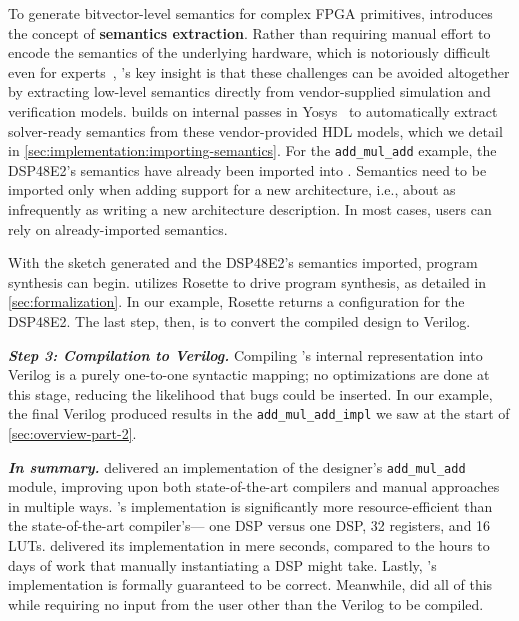 To generate bitvector-level semantics
  for complex FPGA primitives,
  \lr introduces the concept of
  \textbf{semantics extraction}.
Rather than requiring
  manual effort to encode the semantics
  of the underlying hardware,
  which is notoriously difficult
  even for experts~\cite{Bernstein2021WhatAT},
  \lr's key insight is that these challenges
  can be avoided altogether
  by extracting low-level semantics
  directly from
  vendor-supplied simulation and verification models.
\lr builds on internal passes in 
  Yosys~\cite{wolf2013yosys} 
  to automatically extract
  solver-ready semantics from these vendor-provided HDL models,
  which we detail in \cref{sec:implementation:importing-semantics}.
For the
  \texttt{add\_mul\_add} example,
  the DSP48E2's semantics have already been imported into \lr.
Semantics need to be imported only when
  adding support for a new architecture, i.e., %
  about as infrequently
  as writing a new architecture description.
In most cases,
  \lr users can rely on already-imported semantics.
  
With the sketch generated
  and the DSP48E2's semantics imported,
  program synthesis can begin.
\lr utilizes Rosette to drive program synthesis,
  as detailed in \cref{sec:formalization}.
In our example, Rosette returns
  a configuration for the DSP48E2.
The last step, then, is to convert
  the compiled design
  to Verilog.
  
\textit{\textbf{Step 3: Compilation to Verilog.}}
Compiling \lr's internal representation into Verilog
  is a purely 
  one-to-one syntactic mapping;
  no optimizations are done at this stage,
  reducing the likelihood that bugs could be inserted.
In our example,
  the final Verilog produced
  results in the
  \texttt{add\_mul\_add\_impl}
  we saw at the start of \cref{sec:overview-part-2}.

\textit{\textbf{In summary.}}
\lr
  delivered 
  an implementation
  of the designer's
  \texttt{add\_mul\_add}
  module,
  improving upon both state-of-the-art compilers
  and manual approaches
  in multiple ways.
\lr's implementation
  is significantly more resource-efficient
  than the state-of-the-art compiler's---%
  one DSP versus one DSP,
  32 registers, and 16 LUTs.
\lr delivered its implementation
  in mere seconds,
  compared to the hours to days
  of work
  that manually instantiating
  a DSP might take.
Lastly,
  \lr's implementation
  is formally guaranteed to be correct.
Meanwhile, \lr did all of this
  while requiring no input from the user
  other than the Verilog to be compiled.

